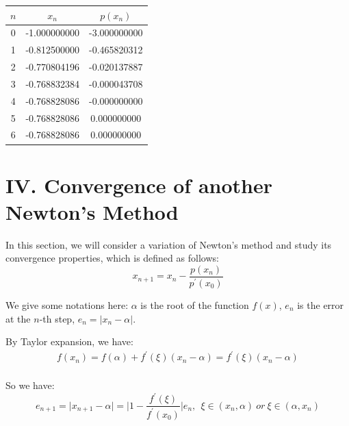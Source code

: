 \documentclass[a4paper]{article}
\begin{document}
\begin{table}[H]
  \begin{center}
    \begin{tabular}{|c|c|c|}
      \hline
      $n$ & $x_n$ & $p(x_n)$\\ \hline
      0 & -1.000000000 & -3.000000000 \\ \hline
      1 & -0.812500000 & -0.465820312 \\ \hline
      2 & -0.770804196 & -0.020137887 \\ \hline
      3 & -0.768832384 & -0.000043708 \\ \hline
      4 & -0.768828086 & -0.000000000 \\ \hline
      5 & -0.768828086 & 0.000000000 \\ \hline
      6 & -0.768828086 & 0.000000000 \\ \hline
    \end{tabular}
  \end{center}
\end{table}

\section*{IV. Convergence of another Newton's Method}

In this section, we will consider a variation of Newton's method and study its convergence properties, which is defined as follows:
\begin{equation}
  x_{n+1} = x_n - \frac{p(x_n)}{p^{\prime}(x_0)}
\end{equation}

We give some notations here: $\alpha$ is the root of the function $f(x)$, $e_n$ is the error at the $n$-th step, $e_n = \vert x_n - \alpha \vert$. 

By Taylor expansion, we have:
\begin{equation}
  \begin{aligned}
    f(x_n) = f(\alpha) + f^{\prime}(\xi) (x_n - \alpha) = f^{\prime}(\xi) (x_n - \alpha)\\
  \end{aligned}
\end{equation}

So we have:
\begin{equation}
  e_{n+1} = \vert x_{n+1} - \alpha \vert = \vert 1-\frac{f^\prime(\xi)}{f^\prime(x_0)} \vert e_n, ~~\xi \in (x_n, \alpha) ~or~ \xi \in (\alpha, x_n)
\end{equation}
\end{document}
